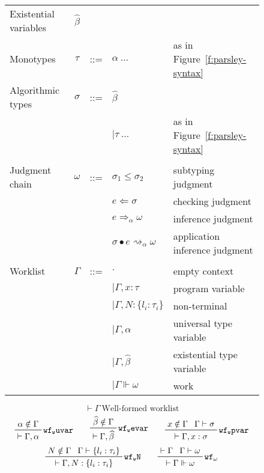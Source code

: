 \documentclass[letterpaper]{article}
\newcommand{\utv}{\alpha}             %
\newcommand{\etv}{\widehat{\beta}}    %
\begin{document}
\begin{figure}
  \begin{tabular}{l c l l l}
    Existential variables & $\etv$   &     &                                   & \\
    Monotypes             & $\tau$   & ::= & $ \utv\ \ldots $                  & as in Figure~\ref{f:parsley-syntax} \\
    Algorithmic types     & $\sigma$ & ::= & $ \etv $                          & \\
                          &          &     & $ \mid \tau\ \ldots $             & as in Figure~\ref{f:parsley-syntax} \\
                          &          &     &                                   & \\
    Judgment chain        & $\omega$ & ::= & $ \sigma_1\leq\sigma_2 $          & subtyping judgment \\
                          &          &     & $ e\Leftarrow\sigma $             & checking judgment \\
                          &          &     & $ e\Rightarrow_\utv\omega $       & inference judgment \\
                          &          &     & $ \sigma\bullet e\rightsquigarrow_\utv\omega $ & application inference judgment \\
                          &          &     &                                   & \\
    Worklist              & $\Gamma$ & ::= & $ \cdot $                         & empty context \\
                          &          &     & $ \mid\Gamma, x: \tau $           & program variable \\
                          &          &     & $ \mid\Gamma, N: \{l_i:\tau_i\} $ & non-terminal \\
                          &          &     & $ \mid\Gamma, \utv $              & universal type variable \\
                          &          &     & $ \mid\Gamma, \etv  $             & existential type variable\\
                          &          &     & $ \mid\Gamma\Vdash\omega $        & work \\

  \end{tabular}
  $$ \boxed{\vdash\Gamma}\ \textrm{Well-formed worklist} $$
  $$ \prftree[r]{$\mathtt{wf_w uvar}$}
             {\prfassumption{\utv\notin\Gamma}}
             {\vdash\Gamma, \utv}\qquad
     \prftree[r]{$\mathtt{wf_w evar}$}
             {\prfassumption{\etv\notin\Gamma}}
             {\vdash\Gamma, \etv}\qquad
     \prftree[r]{$\mathtt{wf_w pvar}$}
             {\prfassumption{x\notin\Gamma}}{\prfassumption{\Gamma\vdash\sigma}}
             {\vdash\Gamma, x:\sigma} $$
  $$ \prftree[r]{$\mathtt{wf_w N}$}
             {\prfassumption{N\notin\Gamma}}{\prfassumption{\Gamma\vdash\{l_i:\tau_i\}}}
             {\vdash\Gamma, N:\{l_i:\tau_i\}}\qquad
     \prftree[r]{$\mathtt{wf_\omega}$}
             {\prfassumption{\vdash\Gamma}}{\prfassumption{\Gamma\vdash\omega}}
             {\vdash\Gamma\Vdash\omega} $$


\end{figure}
\end{document}
